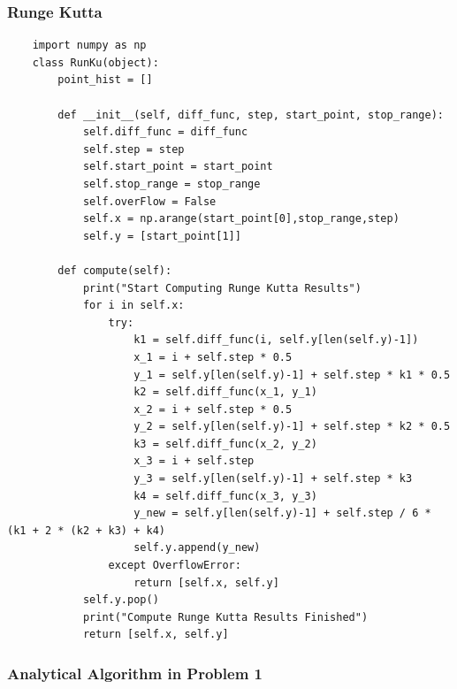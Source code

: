 \documentclass[11pt,a4paper]{article}
\begin{document}
\subsubsection{Runge Kutta}\label{Runge Kutta}

\begin{lstlisting}
	import numpy as np
	class RunKu(object):
		point_hist = []

		def __init__(self, diff_func, step, start_point, stop_range):
			self.diff_func = diff_func
			self.step = step
			self.start_point = start_point
			self.stop_range = stop_range
			self.overFlow = False
			self.x = np.arange(start_point[0],stop_range,step)
			self.y = [start_point[1]]

		def compute(self):
			print("Start Computing Runge Kutta Results")
			for i in self.x:
				try:
					k1 = self.diff_func(i, self.y[len(self.y)-1])
					x_1 = i + self.step * 0.5
					y_1 = self.y[len(self.y)-1] + self.step * k1 * 0.5
					k2 = self.diff_func(x_1, y_1)
					x_2 = i + self.step * 0.5
					y_2 = self.y[len(self.y)-1] + self.step * k2 * 0.5
					k3 = self.diff_func(x_2, y_2)
					x_3 = i + self.step
					y_3 = self.y[len(self.y)-1] + self.step * k3
					k4 = self.diff_func(x_3, y_3)
					y_new = self.y[len(self.y)-1] + self.step / 6 * (k1 + 2 * (k2 + k3) + k4)
					self.y.append(y_new)
				except OverflowError:
					return [self.x, self.y]
			self.y.pop()
			print("Compute Runge Kutta Results Finished")
			return [self.x, self.y]
\end{lstlisting}

\subsubsection{Analytical Algorithm in Problem 1}
\end{document}
